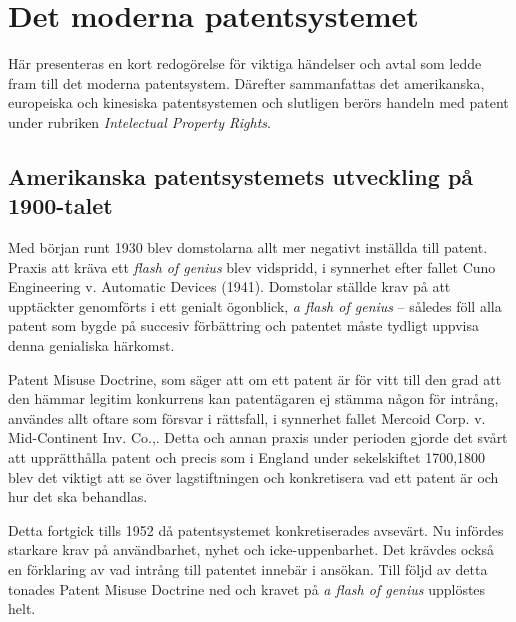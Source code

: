 \section{Det moderna patentsystemet}
\label{sec:mod}

Här presenteras en kort redogörelse för viktiga händelser och avtal som ledde fram till det moderna patentsystem. Därefter sammanfattas det amerikanska, europeiska och kinesiska patentsystemen och slutligen berörs handeln med patent under rubriken \emph{Intelectual Property Rights}.

\subsection{Amerikanska patentsystemets utveckling på 1900-talet}

Med början runt 1930 blev domstolarna allt mer negativt inställda till
patent\cite{bracha}. Praxis att kräva ett \emph{flash of genius} blev vidspridd, i synnerhet efter fallet Cuno
Engineering v. Automatic Devices (1941). Domstolar ställde krav på att upptäckter genomförts i ett
genialt ögonblick, \emph{a flash of genius} -- således föll alla patent som bygde på succesiv förbättring och patentet måste tydligt uppvisa denna genialiska härkomst\cite{nard}. 

Patent Misuse Doctrine, som säger att om ett patent är för vitt till den grad att den hämmar legitim
konkurrens kan patentägaren ej stämma någon för intrång, användes allt oftare som försvar i rättsfall, i
synnerhet fallet Mercoid Corp. v. Mid-Continent Inv. Co.,\cite{nard}. Detta och annan praxis under
perioden gjorde det svårt att upprätthålla patent och precis som i England under sekelskiftet 1700,1800
blev det viktigt att se över lagstiftningen och konkretisera vad ett patent är och hur det ska behandlas.


Detta fortgick tills 1952 då patentsystemet konkretiserades avsevärt. Nu infördes
starkare krav på användbarhet, nyhet och icke-uppenbarhet. Det krävdes också en förklaring av vad
intrång till patentet innebär i ansökan. Till följd av detta tonades Patent Misuse Doctrine ned och
kravet på \emph{a flash of genius} upplöstes helt\cite{nard}.

